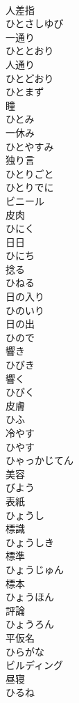 \documentclass[8pt]{extreport}
\begin{document}
\begin{CJK}{UTF8}{min}
\\	人差指 
\\	ひとさしゆび	
\\	一通り 
\\	ひととおり	
\\	人通り 
\\	ひとどおり	
\\	ひとまず	
\\	瞳 
\\	ひとみ	
\\	一休み 
\\	ひとやすみ	
\\	独り言 
\\	ひとりごと	
\\	ひとりでに	
\\	ビニール	
\\	皮肉 
\\	ひにく	
\\	日日 
\\	ひにち	
\\	捻る 
\\	ひねる	
\\	日の入り 
\\	ひのいり	
\\	日の出 
\\	ひので	
\\	響き 
\\	ひびき	
\\	響く 
\\	ひびく	
\\	皮膚 
\\	ひふ	
\\	冷やす 
\\	ひやす	
\\	ひゃっかじてん	
\\	美容 
\\	びよう	
\\	表紙 
\\	ひょうし	
\\	標識 
\\	ひょうしき	
\\	標準 
\\	ひょうじゅん	
\\	標本 
\\	ひょうほん	
\\	評論 
\\	ひょうろん	
\\	平仮名 
\\	ひらがな	
\\	ビルディング	
\\	昼寝 
\\	ひるね	

\end{CJK}
\end{document}

